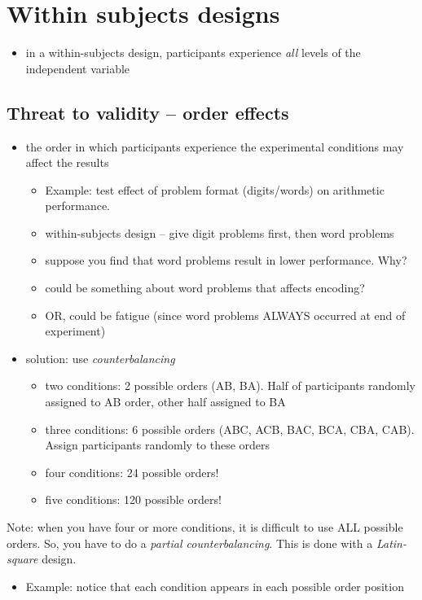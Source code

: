 \documentclass[11pt]{article}
\begin{document}
\section*{Within subjects designs}
\label{sec-2}
\begin{itemize}
\item in a within-subjects design, participants experience \emph{all} levels of the independent variable
\end{itemize}

\subsection*{Threat to validity -- order effects}
\label{sec-2-1}
\begin{itemize}
\item the order in which participants experience the experimental conditions may affect the results
\begin{itemize}
\item Example: test effect of problem format (digits/words) on arithmetic performance.
\item within-subjects design -- give digit problems first, then word problems
\item suppose you find that word problems result in lower performance.  Why?
\item could be something about word problems that affects encoding?
\item OR, could be fatigue (since word problems ALWAYS occurred at end of experiment)
\end{itemize}
\item solution: use \emph{counterbalancing}
\begin{itemize}
\item two conditions: 2 possible orders (AB, BA).  Half of participants randomly assigned to AB order, other half assigned to BA
\item three conditions: 6 possible orders (ABC, ACB, BAC, BCA, CBA, CAB).  Assign participants randomly to these orders
\item four conditions: 24 possible orders!
\item five conditions: 120 possible orders!
\end{itemize}
\end{itemize}

Note: when you have four or more conditions, it is difficult to use ALL possible orders.  So, you have to do a \emph{partial counterbalancing}.  This is done with a \emph{Latin-square} design.
\begin{itemize}
\item Example: notice that each condition appears in each possible order position
\end{itemize}
\end{document}
